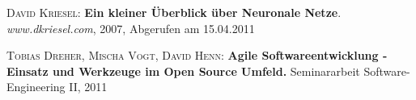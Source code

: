 \begin{thebibliography}{---}

  \textsc{David Kriesel}: 
  \textbf{Ein kleiner Überblick über Neuronale Netze}.
  \emph{www.dkriesel.com}, 2007, Abgerufen am 15.04.2011
  
    \textsc{Tobias Dreher, Mischa Vogt, David Henn:}
    \textbf{Agile Softwareentwicklung - Einsatz und Werkzeuge im Open Source Umfeld.}
    Seminararbeit Software-Engineering II, 2011
    


\end{thebibliography}

